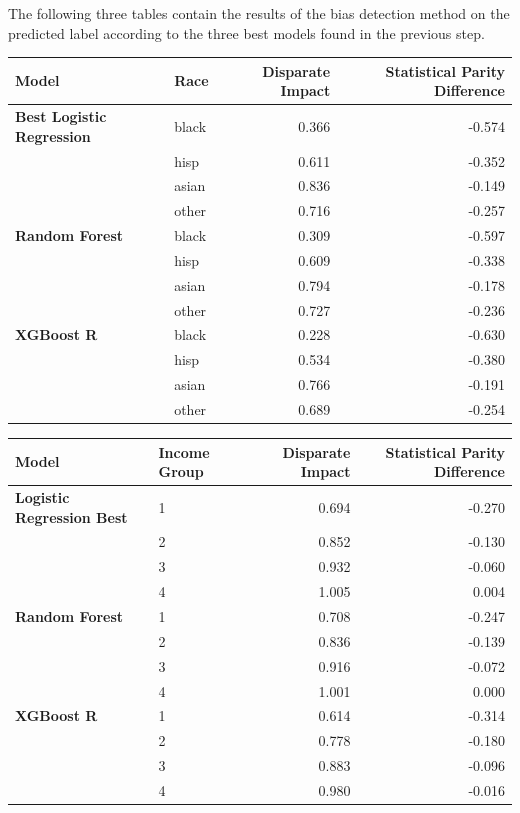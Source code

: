 \documentclass{article}
\begin{document}
The following three tables contain the results of the bias detection method on the predicted label according to the three best models found in the previous step. 

\begin{center}
\begin{tabular}{llrr} 
\toprule
\textbf{Model} & \textbf{Race} & \textbf{Disparate Impact} & \textbf{Statistical Parity Difference} \\
\midrule
\textbf{Best Logistic Regression} & black & 0.366 & -0.574 \\
 & hisp & 0.611 & -0.352 \\
 & asian & 0.836 & -0.149 \\
 & other & 0.716 & -0.257 \\
\midrule
\textbf{Random Forest} & black & 0.309 & -0.597 \\
 & hisp & 0.609 & -0.338 \\
 & asian & 0.794 & -0.178 \\
 & other & 0.727 & -0.236 \\
\midrule
\textbf{XGBoost R} & black & 0.228 & -0.630 \\
 & hisp & 0.534 & -0.380 \\
 & asian & 0.766 & -0.191 \\
 & other & 0.689 & -0.254 \\
\bottomrule
\end{tabular}
\end{center}

\vspace{1em}

\begin{center}
\begin{tabular}{llrr}
\toprule
\textbf{Model} & \textbf{Income Group} & \textbf{Disparate Impact} & \textbf{Statistical Parity Difference} \\
\midrule
\textbf{Logistic Regression Best}
& 1 & 0.694 & -0.270 \\
& 2 & 0.852 & -0.130 \\
& 3 & 0.932 & -0.060 \\
& 4 & 1.005 & 0.004 \\
\midrule
\textbf{Random Forest}
& 1 & 0.708 & -0.247 \\
& 2 & 0.836 & -0.139 \\
& 3 & 0.916 & -0.072 \\
& 4 & 1.001 & 0.000 \\
\midrule
\textbf{XGBoost R}
& 1 & 0.614 & -0.314 \\
& 2 & 0.778 & -0.180 \\
& 3 & 0.883 & -0.096 \\
& 4 & 0.980 & -0.016 \\
\bottomrule
\end{tabular}
\end{center}
\end{document}
